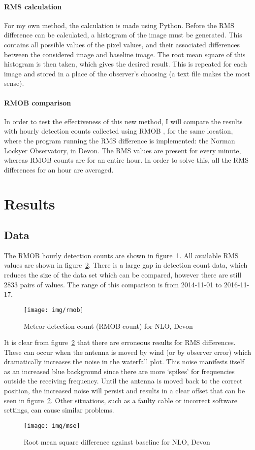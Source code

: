 \paragraph{RMS calculation\\}
For my own method, the calculation is made using Python. Before the RMS difference can be calculated, a histogram of the image must be generated. This contains all possible values of the pixel values, and their associated differences between the considered image and baseline image. The root mean square of this histogram is then taken, which gives the desired result. This is repeated for each image and stored in a place of the observer's choosing (a text file makes the most sense). 
\paragraph{RMOB comparison\\}
In order to test the effectiveness of this new method, I will compare the results with hourly detection counts collected using RMOB \cite{rmob}, for the same location, where the program running the RMS difference is implemented: the Norman Lockyer Observatory, in Devon. The RMS values are present for every minute, whereas RMOB counts are for an entire hour. In order to solve this, all the RMS differences for an hour are averaged.
\section{Results}
\subsection{Data}
The RMOB hourly detection counts are shown in figure~\ref{fig:img:rmob}. All available RMS values are shown in figure~\ref{fig:img:rms}. There is a large gap in detection count data, which reduces the size of the data set which can be compared, however there are still 2833 pairs of values. The range of this comparison is from 2014-11-01 to 2016-11-17. 

\begin{figure}[h!]
	\centering
	\texttt{[image: img/rmob]}
	\caption{Meteor detection count (RMOB count) for NLO, Devon
		\label{fig:img:rmob}}
\end{figure}
It is clear from figure~\ref{fig:img:rms} that there are erroneous results for RMS differences. These can occur when the antenna is moved by wind (or by observer error) which dramatically increases the noise in the waterfall plot. This noise manifests itself as an increased blue background since there are more `spikes' for frequencies outside the receiving frequency. Until the antenna is moved back to the correct position, the increased noise will persist and results in a clear offset that can be seen in figure~\ref{fig:img:rms}. Other situations, such as a faulty cable or incorrect software settings, can cause similar problems.
\begin{figure}[h!]
	\centering
	\texttt{[image: img/mse]}
	\caption{Root mean square difference against baseline for NLO, Devon
		\label{fig:img:rms}}
\end{figure}

